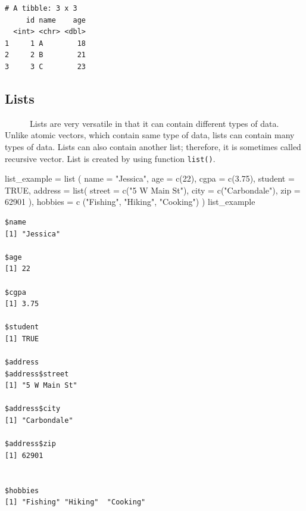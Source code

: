 \documentclass[
  letterpaper,
  DIV=11,
  numbers=noendperiod]{scrreprt}
\newenvironment{Shaded}{\begin{snugshade}}{\end{snugshade}}
\newcommand{\AttributeTok}[1]{\textcolor[rgb]{0.40,0.45,0.13}{#1}}
\newcommand{\ConstantTok}[1]{\textcolor[rgb]{0.56,0.35,0.01}{#1}}
\newcommand{\DecValTok}[1]{\textcolor[rgb]{0.68,0.00,0.00}{#1}}
\newcommand{\FloatTok}[1]{\textcolor[rgb]{0.68,0.00,0.00}{#1}}
\newcommand{\FunctionTok}[1]{\textcolor[rgb]{0.28,0.35,0.67}{#1}}
\newcommand{\NormalTok}[1]{\textcolor[rgb]{0.00,0.23,0.31}{#1}}
\newcommand{\OtherTok}[1]{\textcolor[rgb]{0.00,0.23,0.31}{#1}}
\newcommand{\StringTok}[1]{\textcolor[rgb]{0.13,0.47,0.30}{#1}}
\begin{document}
\begin{verbatim}
# A tibble: 3 x 3
     id name    age
  <int> <chr> <dbl>
1     1 A        18
2     2 B        21
3     3 C        23
\end{verbatim}

\subsection{Lists}\label{lists}

~~~~~~Lists are very versatile in that it can contain different types of
data. Unlike atomic vectors, which contain same type of data, lists can
contain many types of data. Lists can also contain another list;
therefore, it is sometimes called recursive vector. List is created by
using function \texttt{list()}.

\begin{Shaded}
\begin{Highlighting}[]
\NormalTok{list\_example }\OtherTok{=} \FunctionTok{list}\NormalTok{ (}
    \AttributeTok{name =} \StringTok{"Jessica"}\NormalTok{,}
    \AttributeTok{age =} \FunctionTok{c}\NormalTok{(}\DecValTok{22}\NormalTok{),}
    \AttributeTok{cgpa =} \FunctionTok{c}\NormalTok{(}\FloatTok{3.75}\NormalTok{),}
    \AttributeTok{student  =} \ConstantTok{TRUE}\NormalTok{,}
    \AttributeTok{address =} \FunctionTok{list}\NormalTok{(}
        \AttributeTok{street =} \FunctionTok{c}\NormalTok{(}\StringTok{"5 W Main St"}\NormalTok{),}
        \AttributeTok{city =} \FunctionTok{c}\NormalTok{(}\StringTok{"Carbondale"}\NormalTok{),}
        \AttributeTok{zip =} \DecValTok{62901}
\NormalTok{    ),}
    \AttributeTok{hobbies =} \FunctionTok{c}\NormalTok{ (}\StringTok{"Fishing"}\NormalTok{, }\StringTok{"Hiking"}\NormalTok{, }\StringTok{"Cooking"}\NormalTok{)}
\NormalTok{)}
\NormalTok{list\_example}
\end{Highlighting}
\end{Shaded}

\begin{verbatim}
$name
[1] "Jessica"

$age
[1] 22

$cgpa
[1] 3.75

$student
[1] TRUE

$address
$address$street
[1] "5 W Main St"

$address$city
[1] "Carbondale"

$address$zip
[1] 62901


$hobbies
[1] "Fishing" "Hiking"  "Cooking"
\end{verbatim}
\end{document}
